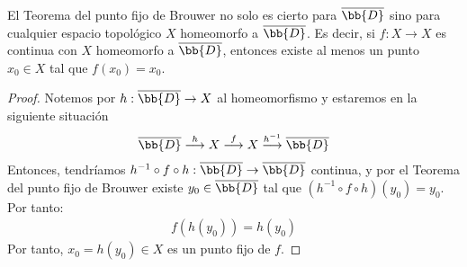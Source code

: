 \begin{observacion}
    El Teorema del punto fijo de Brouwer no solo es cierto para $\overline{\bb{D}}$ sino para cualquier espacio topológico $X$ homeomorfo a $\overline{\bb{D}}$. Es decir, si $f:X\to X$ es continua con $X$ homeomorfo a $\overline{\bb{D}}$, entonces existe al menos un punto $x_0\in X$ tal que $f(x_0)=x_0$.

    \begin{proof}
        Notemos por $h:\overline{\bb{D}}\to X$ al homeomorfismo y estaremos en la siguiente situación
        \begin{gather*}
            \overline{\bb{D}} \overset{h}{\longrightarrow} X \overset{f}{\longrightarrow} X \overset{h^{-1}}{\longrightarrow} \overline{\bb{D}}
        \end{gather*}
        Entonces, tendríamos $h^{-1}\circ f \circ h : \overline{\bb{D}} \to \overline{\bb{D}}$ continua, y por el Teorema del punto fijo de Brouwer existe $y_0\in \overline{\bb{D}}$ tal que $(h^{-1}\circ f \circ h)(y_0) = y_0$. Por tanto:
        \begin{gather*}
            f(h(y_0)) = h(y_0)
        \end{gather*}
        Por tanto, $x_0 = h(y_0)\in X$ es un punto fijo de $f$.
    \end{proof}
\end{observacion}

